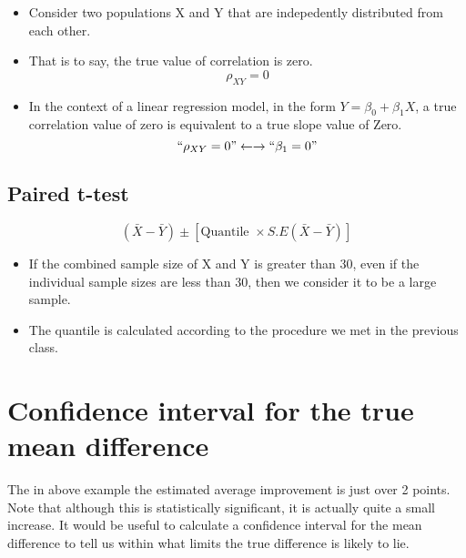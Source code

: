 \begin{itemize}
\item Consider two populations X and Y that are indepedently distributed from
each other.
\item That is to say, the true value of correlation is zero.
\[\rho_{XY} = 0 \]
\item In the context of a linear regression model, in the form $Y=\beta_0  +  \beta_1X$, a true correlation value of zero is equivalent to a true slope value of Zero.
\[``\rho_{XY} = 0" \leftarrow\rightarrow ``\beta_1=0"\]
\end{itemize}




\subsection{Paired t-test}









\[ ( \bar{X} - \bar{Y} ) \pm \left[ \mbox{Quantile } \times S.E(\bar{X}-\bar{Y}) \right] \]
\begin{itemize}
\item If the combined sample size of X and Y is greater than 30, even if the individual sample sizes are less than 30, then we consider it to be a large sample.
\item The quantile is calculated according to the procedure we met in the previous class.


\end{itemize}








\section{Confidence interval for the true mean difference}
The in above example the estimated average improvement is just over 2 points. Note that
although this is statistically significant, it is actually quite a small increase. It would be
useful to calculate a confidence interval for the mean difference to tell us within what limits
the true difference is likely to lie. 



